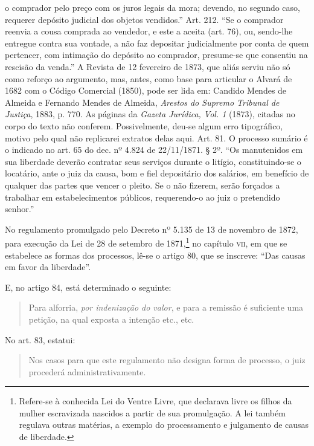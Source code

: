 {{  o comprador pelo preço com os juros legais da mora; devendo, no
  segundo caso, requerer depósito judicial dos objetos vendidos.'' Art.
  212. ``Se o comprador reenvia a cousa comprada ao vendedor, e este a
  aceita (art. 76), ou, sendo-lhe entregue contra sua vontade, a não faz
  depositar judicialmente por conta de quem pertencer, com intimação do
  depósito ao comprador, presume-se que consentiu na rescisão da venda.''
  A Revista de 12 fevereiro de 1873, que aliás serviu não só como
  reforço ao argumento, mas, antes, como base para articular o
  Alvará de 1682 com o Código Comercial (1850), pode ser lida em: 
 Candido Mendes de Almeida e Fernando Mendes de Almeida,
 \emph{Arestos do Supremo Tribunal de Justiça}, 1883, p. 770. As páginas da
  \emph{Gazeta Jurídica, Vol. 1} (1873), citadas no corpo do texto não
  conferem. Possivelmente, deu-se algum erro tipográfico, motivo pelo
  qual não replicarei extratos delas aqui. Art. 81. O processo sumário é
  o indicado no art. 65 do dec. nº 4.824 de 22/11/1871. § 2º. ``Os
  manutenidos em sua liberdade deverão contratar seus serviços durante o
  litígio, constituindo-se o locatário, ante o juiz da causa, bom e fiel
  depositário dos salários, em benefício de qualquer das partes que
  vencer o pleito. Se o não fizerem, serão forçados a trabalhar em
  estabelecimentos públicos, requerendo-o ao juiz o pretendido senhor.''}

No regulamento promulgado pelo Decreto nº 5.135 de 13 de novembro de
1872, para execução da Lei de 28 de setembro de 1871,\footnote{
  Refere-se à conhecida Lei do Ventre Livre, que declarava livre os
  filhos da mulher escravizada nascidos a partir de sua promulgação.
  A lei também regulava outras matérias, a exemplo do processamento
  e julgamento de causas de liberdade.} no capítulo \textsc{vii}, em que se
estabelece as formas dos processos, lê-se o artigo 80, que se inscreve:
``Das causas em favor da liberdade''.

E, no artigo 84, está determinado o seguinte:

\begin{quote}
Para alforria, \emph{por indenização do valor}, e para a remissão é
suficiente uma petição, na qual exposta a intenção etc., etc.
\end{quote}

No art. 83, estatui:

\begin{quote}
Nos casos para que este regulamento não designa forma de processo, o
juiz procederá administrativamente.
\end{quote}

}
